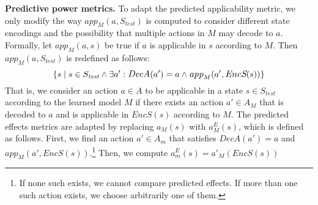 \documentclass{article}
\newcommand{\miniparagraph}[1]{\textbf{#1.}}
\theoremstyle{definition}
\theoremstyle{remark}
\newcommand{\stest}{\ensuremath{S_{\textit{test}}}\xspace}
\newcommand{\app}{\ensuremath{\textit{app}}\xspace}
\newcommand{\encodes}{\textit{EncS}\xspace}
\newcommand{\decodea}{\textit{DecA}\xspace}
\begin{document}





\miniparagraph{Predictive power metrics}
To adapt the predicted applicability metric, we only modify the way $\app_M(a,\stest)$ is computed to consider different state encodings and the possibility that multiple actions in $M$ may decode to $a$. 
Formally, let $\app_M(a,s)$ be true if $a$ is applicable in $s$ according to $M$. Then $\app_M(a,\stest)$ is redefined as follows:
\begin{equation}
    \large\{s \mid s\in\stest  \wedge 
        \exists a': \decodea(a')=a  
        \wedge \app_M(a',\encodes(s))\large\}        
\end{equation}
That is, we consider an action $a\in A$ to be applicable in a state $s\in\stest$ according to the learned model $M$ if there exists an action $a'\in A_M$ that is decoded to $a$ and is applicable in $\encodes(s)$ according to $M$. 
The predicted effects metrics are adapted 
by replacing $a_M(s)$ with $a^E_M(s)$, which is defined as follows. 
First, we find an action $a'\in A_m$ that satisfies $\decodea(a')=a$ and 
$\app_M(a',\encodes(s))$.\footnote{If none such exists, we cannot compare predicted effects. If more than one such action exists, we choose arbitrarily one of them.} 
Then, we compute $a^E_m(s)=a'_M(\encodes(s))$
\end{document}
